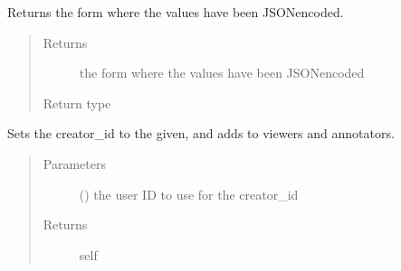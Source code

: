 \documentclass[letterpaper,10pt,english]{sphinxmanual}
\begin{document}
\begin{fulllineitems}
\begin{fulllineitems}
\begin{quote}
\begin{description}
\end{description}\end{quote}

\end{fulllineitems}


\begin{fulllineitems}
\label{\detokenize{autoapi/pine/client/index:pine.client.CollectionBuilder.form_json}}
Returns the form where the values have been JSON\sphinxhyphen{}encoded.
\begin{quote}\begin{description}
\item[{Returns}] \leavevmode
the form where the values have been JSON\sphinxhyphen{}encoded

\item[{Return type}] \leavevmode
{}

\end{description}\end{quote}

\end{fulllineitems}


\begin{fulllineitems}
\label{\detokenize{autoapi/pine/client/index:pine.client.CollectionBuilder.creator_id}}
Sets the creator\_id to the given, and adds to viewers and annotators.
\begin{quote}\begin{description}
\item[{Parameters}] \leavevmode
{} () \textendash{} the user ID to use for the creator\_id

\item[{Returns}] \leavevmode
self


\end{description}
\end{quote}
\end{fulllineitems}
\end{fulllineitems}
\end{document}
